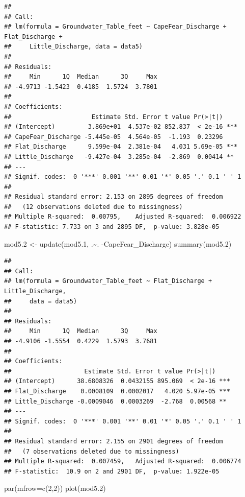 \documentclass[
  12pt,
]{article}
\newenvironment{Shaded}{\begin{snugshade}}{\end{snugshade}}
\newcommand{\AttributeTok}[1]{\textcolor[rgb]{0.77,0.63,0.00}{#1}}
\newcommand{\DecValTok}[1]{\textcolor[rgb]{0.00,0.00,0.81}{#1}}
\newcommand{\FloatTok}[1]{\textcolor[rgb]{0.00,0.00,0.81}{#1}}
\newcommand{\FunctionTok}[1]{\textcolor[rgb]{0.00,0.00,0.00}{#1}}
\newcommand{\NormalTok}[1]{#1}
\newcommand{\OtherTok}[1]{\textcolor[rgb]{0.56,0.35,0.01}{#1}}
\newcommand{\SpecialCharTok}[1]{\textcolor[rgb]{0.00,0.00,0.00}{#1}}
\begin{document}
\begin{verbatim}
## 
## Call:
## lm(formula = Groundwater_Table_feet ~ CapeFear_Discharge + Flat_Discharge + 
##     Little_Discharge, data = data5)
## 
## Residuals:
##     Min      1Q  Median      3Q     Max 
## -4.9713 -1.5423  0.4185  1.5724  3.7801 
## 
## Coefficients:
##                      Estimate Std. Error t value Pr(>|t|)    
## (Intercept)         3.869e+01  4.537e-02 852.837  < 2e-16 ***
## CapeFear_Discharge -5.445e-05  4.564e-05  -1.193  0.23296    
## Flat_Discharge      9.599e-04  2.381e-04   4.031 5.69e-05 ***
## Little_Discharge   -9.427e-04  3.285e-04  -2.869  0.00414 ** 
## ---
## Signif. codes:  0 '***' 0.001 '**' 0.01 '*' 0.05 '.' 0.1 ' ' 1
## 
## Residual standard error: 2.153 on 2895 degrees of freedom
##   (12 observations deleted due to missingness)
## Multiple R-squared:  0.00795,    Adjusted R-squared:  0.006922 
## F-statistic: 7.733 on 3 and 2895 DF,  p-value: 3.828e-05
\end{verbatim}

\begin{Shaded}
\begin{Highlighting}[]
\NormalTok{mod5}\FloatTok{.2} \OtherTok{\textless{}{-}} \FunctionTok{update}\NormalTok{(mod5}\FloatTok{.1}\NormalTok{, .}\SpecialCharTok{\textasciitilde{}}\NormalTok{. }\SpecialCharTok{{-}}\NormalTok{CapeFear\_Discharge)}
\FunctionTok{summary}\NormalTok{(mod5}\FloatTok{.2}\NormalTok{)}
\end{Highlighting}
\end{Shaded}

\begin{verbatim}
## 
## Call:
## lm(formula = Groundwater_Table_feet ~ Flat_Discharge + Little_Discharge, 
##     data = data5)
## 
## Residuals:
##     Min      1Q  Median      3Q     Max 
## -4.9106 -1.5554  0.4229  1.5793  3.7681 
## 
## Coefficients:
##                    Estimate Std. Error t value Pr(>|t|)    
## (Intercept)      38.6808326  0.0432155 895.069  < 2e-16 ***
## Flat_Discharge    0.0008109  0.0002017   4.020 5.97e-05 ***
## Little_Discharge -0.0009046  0.0003269  -2.768  0.00568 ** 
## ---
## Signif. codes:  0 '***' 0.001 '**' 0.01 '*' 0.05 '.' 0.1 ' ' 1
## 
## Residual standard error: 2.155 on 2901 degrees of freedom
##   (7 observations deleted due to missingness)
## Multiple R-squared:  0.007459,   Adjusted R-squared:  0.006774 
## F-statistic:  10.9 on 2 and 2901 DF,  p-value: 1.922e-05
\end{verbatim}

\begin{Shaded}
\begin{Highlighting}[]
\FunctionTok{par}\NormalTok{(}\AttributeTok{mfrow=}\FunctionTok{c}\NormalTok{(}\DecValTok{2}\NormalTok{,}\DecValTok{2}\NormalTok{))}
\FunctionTok{plot}\NormalTok{(mod5}\FloatTok{.2}\NormalTok{)}
\end{Highlighting}
\end{Shaded}
\end{document}
